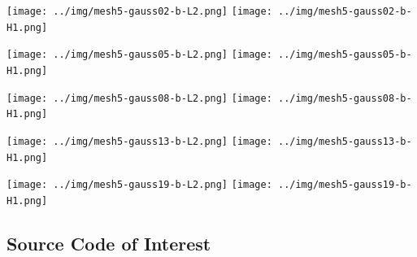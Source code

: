 \documentclass[
  11pt,
]{article}
\let\origfigure\figure
\let\endorigfigure\endfigure
\renewenvironment{figure}[1][2] {
    \expandafter\origfigure\expandafter[H]
} {
    \endorigfigure
}
\begin{document}
\begin{figure}
\caption{Finite element error in the L2 and H1 norms/seminorms, respectively for problem 1 over mesh number 4 using order 19 quadrature.}
\end{figure}

\texttt{[image: ../img/mesh5-gauss02-b-L2.png]}
\texttt{[image: ../img/mesh5-gauss02-b-H1.png]}

\begin{figure}
\caption{Finite element error in the L2 and H1 norms/seminorms, respectively for problem 1 over mesh number 5 using order 2 quadrature.}
\end{figure}

\texttt{[image: ../img/mesh5-gauss05-b-L2.png]}
\texttt{[image: ../img/mesh5-gauss05-b-H1.png]}

\begin{figure}
\caption{Finite element error in the L2 and H1 norms/seminorms, respectively for problem 1 over mesh number 5 using order 5 quadrature.}
\end{figure}

\texttt{[image: ../img/mesh5-gauss08-b-L2.png]}
\texttt{[image: ../img/mesh5-gauss08-b-H1.png]}

\begin{figure}
\caption{Finite element error in the L2 and H1 norms/seminorms, respectively for problem 1 over mesh number 5 using order 8 quadrature.}
\end{figure}

\texttt{[image: ../img/mesh5-gauss13-b-L2.png]}
\texttt{[image: ../img/mesh5-gauss13-b-H1.png]}

\begin{figure}
\caption{Finite element error in the L2 and H1 norms/seminorms, respectively for problem 1 over mesh number 5 using order 13 quadrature.}
\end{figure}

\texttt{[image: ../img/mesh5-gauss19-b-L2.png]}
\texttt{[image: ../img/mesh5-gauss19-b-H1.png]}

\begin{figure}
\caption{Finite element error in the L2 and H1 norms/seminorms, respectively for problem 1 over mesh number 5 using order 19 quadrature.}
\end{figure}

\newpage{}

\hypertarget{source-code-of-interest}{%
\subsection{Source Code of Interest}\label{source-code-of-interest}}
\end{document}
